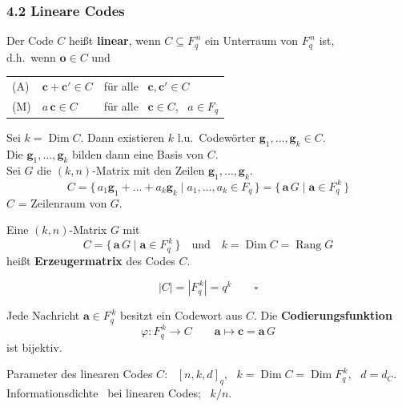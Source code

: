 \subsubsection*{4.2 Lineare Codes}


\begin{definition}
Der Code $C$ heißt \textbf{linear}, wenn $C \subseteq F_q^{\,n}$ ein Unterraum von $F_q^{\,n}$ ist,\\
d.h.\ wenn $\mathbf{o} \in C$ und\\
\begin{tabular}{lll}
(A) & $\mathbf{c} + \mathbf{c}' \in C$ & für alle \ $\mathbf{c}, \mathbf{c}' \in C$ \\
(M) & $a\,\mathbf{c} \in C$ & für alle \ $\mathbf{c} \in C$, \ $a \in F_q$ \\
\end{tabular}
\end{definition}

Sei $k = \operatorname{Dim} C$. Dann existieren $k$ l.u.\ Codewörter $\mathbf{g}_1, \dots, \mathbf{g}_k \in C$.\\
Die $\mathbf{g}_1, \dots, \mathbf{g}_k$ bilden dann eine Basis von $C$.\\
Sei $G$ die $(k, n)$-Matrix mit den Zeilen $\mathbf{g}_1, \dots, \mathbf{g}_k$.
\[ C = \{\, a_1\mathbf{g}_1 + \dots + a_k\mathbf{g}_k \mid a_1, \dots, a_k \in F_q \,\} = \{\, \mathbf{a}\,G \mid \mathbf{a} \in F_q^{\,k} \,\} \]
$C$ = Zeilenraum von $G$.

\begin{definition}[Erzeugermatrix]
Eine $(k, n)$-Matrix $G$ mit
\[ C = \{\, \mathbf{a}\,G \mid \mathbf{a} \in F_q^{\,k} \,\} \quad \text{und} \quad k = \operatorname{Dim} C = \operatorname{Rang} G \]
heißt \textbf{Erzeugermatrix} des Codes $C$.
\end{definition}

\begin{korollar}[Folgerung]
\[ |C| = |F_q^{\,k}| = q^k \qquad \square \]
\end{korollar}

Jede Nachricht $\mathbf{a} \in F_q^{\,k}$ besitzt ein Codewort aus $C$. Die \textbf{Codierungsfunktion}
\[ \varphi : F_q^{\,k} \to C \qquad \mathbf{a} \mapsto \mathbf{c} = \mathbf{a}\,G \]
ist bijektiv.

Parameter des linearen Codes $C$: \ $[n, k, d]_q$, \ $k = \operatorname{Dim} C = \operatorname{Dim} F_q^{\,k}$, \ $d = d_C$.\\
Informationsdichte \ bei linearen Codes; \ $k / n$.

